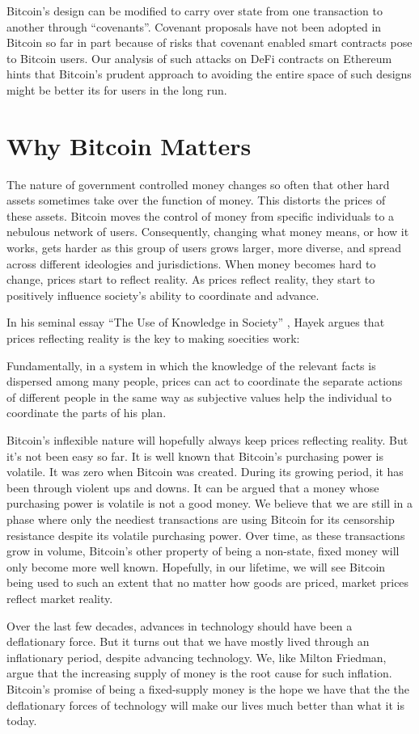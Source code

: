 Bitcoin's design can be modified to carry over state from one transaction to another through ``covenants''. Covenant proposals have not been adopted in Bitcoin so far in part because of risks that covenant enabled smart contracts pose to Bitcoin users. Our analysis of such attacks on DeFi contracts on Ethereum hints that Bitcoin's prudent approach to avoiding the entire space of such designs might be better its for users in the long run.

\section{Why Bitcoin Matters}
The nature of government controlled money changes so often that other hard assets sometimes take over the function of money. This distorts the prices of these assets. Bitcoin moves the control of money from specific individuals to a nebulous network of users. Consequently, changing what money means, or how it works, gets harder as this group of users grows larger, more diverse, and spread across different ideologies and jurisdictions. When money becomes hard to change, prices start to reflect reality. As prices reflect reality, they start to positively influence society's ability to coordinate and advance.

In his seminal essay ``The Use of Knowledge in Society'' \cite{Hayek_AER45}, Hayek argues that prices reflecting reality is the key to making soecities work:
\begin{displayquote}
Fundamentally, in a system in which the knowledge of the relevant facts is dispersed among many people, prices can act to coordinate the separate actions of different people in the same way as subjective values help the individual to coordinate the parts of his plan.
\end{displayquote}

Bitcoin's inflexible nature will hopefully always keep prices reflecting reality. But it's not been easy so far. It is well known that Bitcoin's purchasing power is volatile. It was zero when Bitcoin was created. During its growing period, it has been through violent ups and downs. It can be argued that a money whose purchasing power is volatile is not a good money. We believe that we are still in a phase where only the neediest transactions are using Bitcoin for its censorship resistance despite its volatile purchasing power. Over time, as these transactions grow in volume, Bitcoin's other property of being a non-state, fixed money will only become more well known. Hopefully, in our lifetime, we will see Bitcoin being used to such an extent that no matter how goods are priced, market prices reflect market reality.

Over the last few decades, advances in technology should have been a deflationary force. But it turns out that we have mostly lived through an inflationary period, despite advancing technology. We, like Milton Friedman, argue that the increasing supply of money is the root cause for such inflation. Bitcoin's promise of being a fixed-supply money is the hope we have that the the deflationary forces of technology will make our lives much better than what it is today.